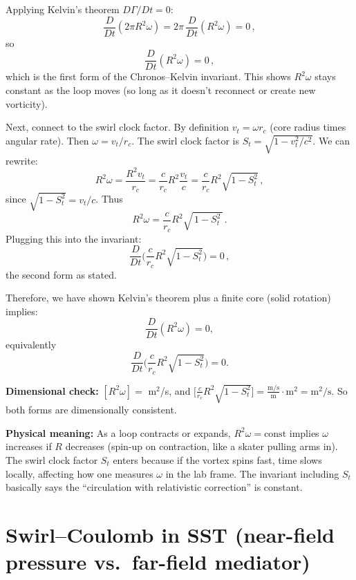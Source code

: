 \documentclass[10pt,reprint,aps,onecolumn,nofootinbib]{revtex4-2}
\begin{document}
        Applying Kelvin’s theorem $D\Gamma/Dt=0$:
        \[
            \frac{D}{Dt}(2\pi R^2 \omega) = 2\pi\,\frac{D}{Dt}(R^2 \omega) = 0\,,
        \]
        so
        \[
            \frac{D}{Dt}(R^2 \omega) = 0\,,
        \]
        which is the first form of the Chronos–Kelvin invariant. This shows $R^2 \omega$ stays constant as the loop moves (so long as it doesn’t reconnect or create new vorticity).

        Next, connect to the swirl clock factor. By definition $v_t = \omega r_c$ (core radius times angular rate). Then $\omega = v_t/r_c$. The swirl clock factor is $S_t = \sqrt{1 - v_t^2/c^2}$. We can rewrite:
        \[
            R^2 \omega = \frac{R^2 v_t}{r_c} = \frac{c}{r_c} R^2 \frac{v_t}{c} = \frac{c}{r_c} R^2 \sqrt{1 - S_t^2}\,,
        \]
        since $\sqrt{1 - S_t^2} = v_t/c$. Thus
        \[
            R^2 \omega = \frac{c}{r_c} R^2 \sqrt{\,1 - S_t^2\,}\,.
        \]
        Plugging this into the invariant:
        \[
            \frac{D}{Dt}\Big(\frac{c}{r_c} R^2 \sqrt{1 - S_t^2}\Big) = 0\,,
        \]
        the second form as stated.

        Therefore, we have shown Kelvin’s theorem plus a finite core (solid rotation) implies:
        \[
            \frac{D}{Dt}(R^2 \omega) = 0,
        \]
        equivalently
        \[
            \frac{D}{Dt}\Big(\frac{c}{r_c}R^2\sqrt{1 - S_t^2}\Big) = 0.
        \]

        \noindent\textbf{Dimensional check:} $[R^2 \omega] =$ m$^2$/s, and
        $\big[\frac{c}{r_c}R^2\sqrt{1 - S_t^2}\big] = \frac{\text{m/s}}{\text{m}} \cdot \text{m}^2 = \text{m}^2/\text{s}$. So both forms are dimensionally consistent.

        \noindent\textbf{Physical meaning:} As a loop contracts or expands, $R^2 \omega = \text{const}$ implies $\omega$ increases if $R$ decreases (spin-up on contraction, like a skater pulling arms in). The swirl clock factor $S_t$ enters because if the vortex spins fast, time slows locally, affecting how one measures $\omega$ in the lab frame. The invariant including $S_t$ basically says the “circulation with relativistic correction” is constant.

    \section{Swirl--Coulomb in SST (near-field pressure vs.\ far-field mediator)}\label{app:swirl_coulomb}
\end{document}
